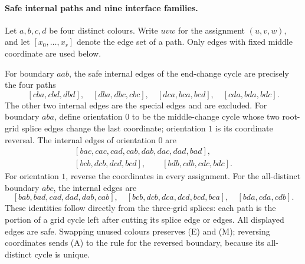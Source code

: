 \paragraph{Safe internal paths and nine interface families.}
Let $a,b,c,d$ be four distinct colours. Write $uvw$ for the assignment
$(u,v,w)$, and let $[x_0,\ldots,x_r]$ denote the edge set of a path.
Only edges with fixed middle coordinate are used below.

For boundary $aab$, the safe internal edges of the end-change cycle
are precisely the four paths
\[
[cba,cbd,dbd],\quad[dba,dbc,cbc],\quad
[dca,bca,bcd],\quad[cda,bda,bdc].
\tag{E}
\]
The other two internal edges are the special edges and are excluded.
For boundary $aba$, define orientation $0$ to be the middle-change
cycle whose two root-grid splice edges change the last coordinate;
orientation $1$ is its coordinate reversal. The internal edges of
orientation $0$ are
\[
\begin{gathered}
[bac,cac,cad,cab,dab,dac,dad,bad],\\
[bcb,dcb,dcd,bcd],\qquad[bdb,cdb,cdc,bdc].
\end{gathered}
\tag{M}
\]
For orientation $1$, reverse the coordinates in every assignment.
For the all-distinct boundary $abc$, the internal edges are
\[
[bab,bad,cad,dad,dab,cab],\quad
[bcb,dcb,dca,dcd,bcd,bca],\quad
[bda,cda,cdb].
\tag{A}
\]
These identities follow directly from the three-grid splices: each
path is the portion of a grid cycle left after cutting its splice
edge or edges. All displayed edges are safe. Swapping unused colours
preserves (E) and (M); reversing coordinates sends (A) to the rule for
the reversed boundary, because its all-distinct cycle is unique.

